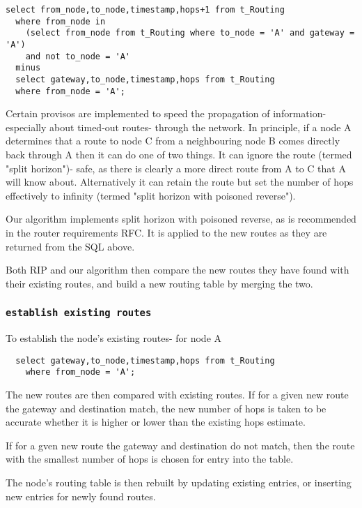 \documentclass{cmspaper}
\begin{document}
{\small\begin{verbatim}
select from_node,to_node,timestamp,hops+1 from t_Routing
  where from_node in 
    (select from_node from t_Routing where to_node = 'A' and gateway = 'A')
    and not to_node = 'A'
  minus
  select gateway,to_node,timestamp,hops from t_Routing
  where from_node = 'A';
\end{verbatim}}

Certain provisos are implemented to speed the propagation of information- especially about timed-out routes- through the network. In principle, if a node A determines that a route to node C from a neighbouring node B comes directly back through A then it can do one of two things. It can ignore the route (termed "split horizon")- safe, as there is clearly a more direct route from A to C that A will know about. Alternatively it can retain the route but set the number of hops effectively to infinity (termed "split horizon with poisoned reverse").

Our algorithm implements split horizon with poisoned reverse, as is recommended in the router requirements RFC. It is applied to the new routes as they are returned from the SQL above.

Both RIP and our algorithm then compare the new routes they have found with their existing routes, and build a new routing table by merging the two.

\subsubsection{\textbf{\texttt{establish existing routes}}}
To establish the node's existing routes- for node A

{\small\begin{verbatim}
  select gateway,to_node,timestamp,hops from t_Routing
    where from_node = 'A';
\end{verbatim}}

The new routes are then compared with existing routes. If for a given new route the gateway and destination match, the new number of hops is taken to be accurate whether it is higher or lower than the existing hops estimate.

If for a gven new route the gateway and destination do not match, then the route with the smallest number of hops is chosen for entry into the table.

The node's routing table is then rebuilt by updating existing entries, or inserting new entries for newly found routes.
\end{document}
